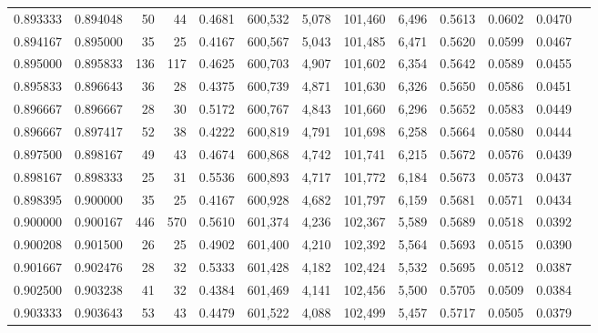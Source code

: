 \begin{tabular}{rrrrrrrrrrrrr}
0.893333 & 0.894048 &    50 &  44 &                                     0.4681 & 600,532 &   5,078 & 101,460 &   6,496 & 0.5613 & 0.0602 & 0.0470 \\
0.894167 & 0.895000 &    35 &  25 &                                     0.4167 & 600,567 &   5,043 & 101,485 &   6,471 & 0.5620 & 0.0599 & 0.0467 \\
0.895000 & 0.895833 &   136 & 117 &                                     0.4625 & 600,703 &   4,907 & 101,602 &   6,354 & 0.5642 & 0.0589 & 0.0455 \\
0.895833 & 0.896643 &    36 &  28 &                                     0.4375 & 600,739 &   4,871 & 101,630 &   6,326 & 0.5650 & 0.0586 & 0.0451 \\
0.896667 & 0.896667 &    28 &  30 &                                     0.5172 & 600,767 &   4,843 & 101,660 &   6,296 & 0.5652 & 0.0583 & 0.0449 \\
0.896667 & 0.897417 &    52 &  38 &                                     0.4222 & 600,819 &   4,791 & 101,698 &   6,258 & 0.5664 & 0.0580 & 0.0444 \\
0.897500 & 0.898167 &    49 &  43 &                                     0.4674 & 600,868 &   4,742 & 101,741 &   6,215 & 0.5672 & 0.0576 & 0.0439 \\
0.898167 & 0.898333 &    25 &  31 &                                     0.5536 & 600,893 &   4,717 & 101,772 &   6,184 & 0.5673 & 0.0573 & 0.0437 \\
0.898395 & 0.900000 &    35 &  25 &                                     0.4167 & 600,928 &   4,682 & 101,797 &   6,159 & 0.5681 & 0.0571 & 0.0434 \\
0.900000 & 0.900167 &   446 & 570 &                                     0.5610 & 601,374 &   4,236 & 102,367 &   5,589 & 0.5689 & 0.0518 & 0.0392 \\
0.900208 & 0.901500 &    26 &  25 &                                     0.4902 & 601,400 &   4,210 & 102,392 &   5,564 & 0.5693 & 0.0515 & 0.0390 \\
0.901667 & 0.902476 &    28 &  32 &                                     0.5333 & 601,428 &   4,182 & 102,424 &   5,532 & 0.5695 & 0.0512 & 0.0387 \\
0.902500 & 0.903238 &    41 &  32 &                                     0.4384 & 601,469 &   4,141 & 102,456 &   5,500 & 0.5705 & 0.0509 & 0.0384 \\
0.903333 & 0.903643 &    53 &  43 &                                     0.4479 & 601,522 &   4,088 & 102,499 &   5,457 & 0.5717 & 0.0505 & 0.0379 \\

\end{tabular}

